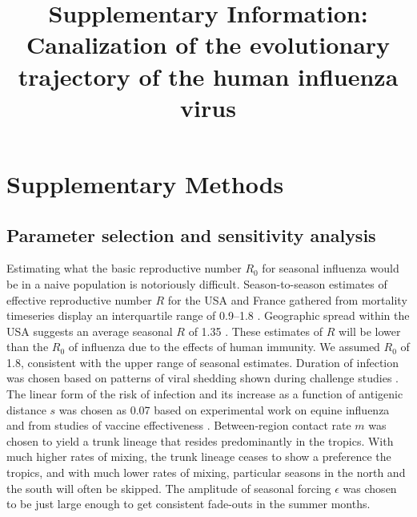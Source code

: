 \setcounter{figure}{0}
\setcounter{table}{0}
\setcounter{page}{1}
\renewcommand{\thefigure}{Supplementary Fig.~\arabic{figure}}
\renewcommand{\thetable}{Supplementary Table~\arabic{table}}
\renewcommand{\thepage}{S\arabic{page}}
  
\title{\huge \bf Supplementary Information:\\ \vspace{0.5cm} \Large Canalization of the evolutionary trajectory of the human influenza virus}
\maketitle

\section*{Supplementary Methods}

\subsection*{Parameter selection and sensitivity analysis}

Estimating what the basic reproductive number $R_0$ for seasonal influenza would be in a naive population is notoriously difficult.  Season-to-season estimates of effective reproductive number $R$ for the USA and France gathered from mortality timeseries display an interquartile range of 0.9--1.8 .  Geographic spread within the USA suggests an average seasonal $R$ of 1.35 .  These estimates of $R$ will be lower than the $R_0$ of influenza due to the effects of human immunity.  We assumed $R_0$ of 1.8, consistent with the upper range of seasonal estimates.  Duration of infection was chosen based on patterns of viral shedding shown during challenge studies .  The linear form of the risk of infection and its increase as a function of antigenic distance $s$ was chosen as 0.07 based on experimental work on equine influenza  and from studies of vaccine effectiveness .  Between-region contact rate $m$ was chosen to yield a trunk lineage that resides predominantly in the tropics.  With much higher rates of mixing, the trunk lineage ceases to show a preference the tropics, and with much lower rates of mixing, particular seasons in the north and the south will often be skipped.  The amplitude of seasonal forcing $\epsilon$ was chosen to be just large enough to get consistent fade-outs in the summer months.


